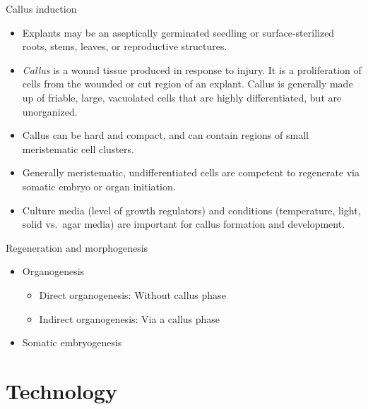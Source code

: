 \documentclass[ignorenonframetext,aspectratio=169]{beamer}
\providecommand{\tightlist}{%
  \setlength{\itemsep}{0pt}\setlength{\parskip}{0pt}}
\begin{document}
\begin{frame}{Callus induction}
\protect\hypertarget{callus-induction}{}

\begin{itemize}
\tightlist
\item
  Explants may be an aseptically germinated seedling or
  surface-sterilized roots, stems, leaves, or reproductive structures.
\item
  \emph{Callus} is a wound tissue produced in response to injury. It is
  a proliferation of cells from the wounded or cut region of an explant.
  Callus is generally made up of friable, large, vacuolated cells that
  are highly differentiated, but are unorganized.
\item
  Callus can be hard and compact, and can contain regions of small
  meristematic cell clusters.
\item
  Generally meristematic, undifferentiated cells are competent to
  regenerate via somatic embryo or organ initiation.
\item
  Culture media (level of growth regulators) and conditions
  (temperature, light, solid vs.~agar media) are important for callus
  formation and development.
\end{itemize}

\end{frame}

\begin{frame}{Regeneration and morphogenesis}
\protect\hypertarget{regeneration-and-morphogenesis}{}

\begin{itemize}
\tightlist
\item
  Organogenesis

  \begin{itemize}
  \tightlist
  \item
    Direct organogenesis: Without callus phase
  \item
    Indirect organogenesis: Via a callus phase
  \end{itemize}
\item
  Somatic embryogenesis
\end{itemize}

\end{frame}

\hypertarget{technology}{%
\section{Technology}\label{technology}}
\end{document}
